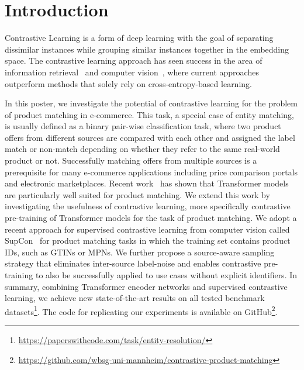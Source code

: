 \documentclass[sigconf]{acmart}
\begin{document}


\maketitle

\section{Introduction}
\label{sec:introduction}

Contrastive Learning is a form of deep learning with the goal of separating dissimilar instances while grouping similar instances together in the embedding space. The contrastive learning approach has seen success in the area of information retrieval~\cite{gaoSimCSESimpleContrastive2021} and computer vision~\cite{chenSimpleFrameworkContrastive2020,khoslaSupervisedContrastiveLearning2021}, where current approaches~\cite{khoslaSupervisedContrastiveLearning2021}  outperform methods that solely rely on cross-entropy-based learning. 

In this poster, we investigate the potential of contrastive learning for the problem of product matching in e-commerce. This task, a special case of entity matching, is usually defined as a binary pair-wise classification task, where two product offers from different sources are compared with each other and assigned the label match or non-match depending on whether they refer to the same real-world product or not. Successfully matching offers from multiple sources is a prerequisite for many e-commerce applications including price comparison portals and electronic marketplaces. Recent work~\cite{liDeepEntityMatching2020,peetersDualobjectiveFinetuningBERT2021} has shown that Transformer models are particularly well suited for product matching. We extend this work by investigating the usefulness of contrastive learning, more specifically contrastive pre-training of Transformer models for the task of product matching. We adopt a recent approach for supervised contrastive learning from computer vision called SupCon~\cite{khoslaSupervisedContrastiveLearning2021} for product matching tasks in which the training set contains product IDs, such as GTINs or MPNs. We further propose a source-aware sampling strategy that eliminates inter-source label-noise and enables contrastive pre-training to also be successfully applied to use cases without explicit identifiers. In summary, combining Transformer encoder networks and supervised contrastive learning, we achieve new state-of-the-art results on all tested benchmark datasets\footnote{\url{https://paperswithcode.com/task/entity-resolution/}}. The code for replicating our experiments is available on GitHub\footnote{\url{https://github.com/wbsg-uni-mannheim/contrastive-product-matching}}.
\end{document}
